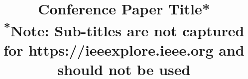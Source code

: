 \documentclass[conference]{IEEEtran}
\begin{document}
\title{Conference Paper Title*\\
{\footnotesize \textsuperscript{*}Note: Sub-titles are not captured for https://ieeexplore.ieee.org  and
should not be used}
}


\maketitle






% 
% 
% 

\nocite{*}


\end{document}
